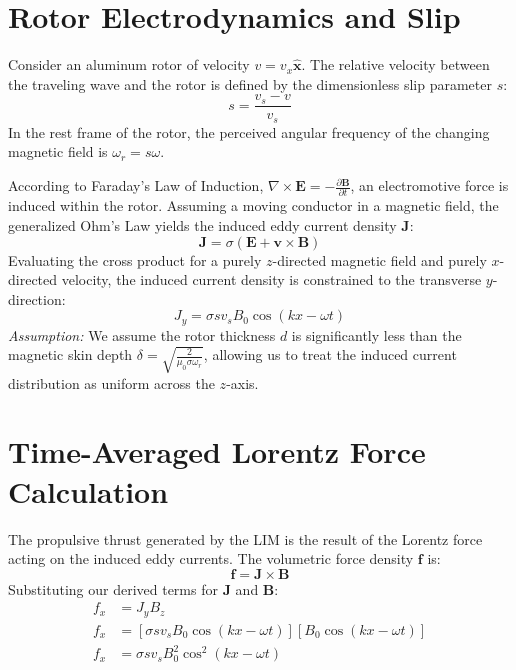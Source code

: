 \documentclass[12pt, a4paper]{article}
\begin{document}
\section{Rotor Electrodynamics and Slip}
Consider an aluminum rotor of velocity $v = v_x \mathbf{\hat{x}}$. The relative velocity between the traveling wave and the rotor is defined by the dimensionless slip parameter $s$:
\begin{equation}
    s = \frac{v_s - v}{v_s}
\end{equation}
In the rest frame of the rotor, the perceived angular frequency of the changing magnetic field is $\omega_r = s\omega$.

According to Faraday's Law of Induction, $\nabla \times \mathbf{E} = -\frac{\partial \mathbf{B}}{\partial t}$, an electromotive force is induced within the rotor. Assuming a moving conductor in a magnetic field, the generalized Ohm's Law yields the induced eddy current density $\mathbf{J}$:
\begin{equation}
    \mathbf{J} = \sigma(\mathbf{E} + \mathbf{v} \times \mathbf{B})
\end{equation}
Evaluating the cross product for a purely $z$-directed magnetic field and purely $x$-directed velocity, the induced current density is constrained to the transverse $y$-direction:
\begin{equation}
    J_y = \sigma s v_s B_0 \cos(kx - \omega t)
\end{equation}
\textit{Assumption:} We assume the rotor thickness $d$ is significantly less than the magnetic skin depth $\delta = \sqrt{\frac{2}{\mu_0 \sigma \omega_r}}$, allowing us to treat the induced current distribution as uniform across the $z$-axis.

\section{Time-Averaged Lorentz Force Calculation}
The propulsive thrust generated by the LIM is the result of the Lorentz force acting on the induced eddy currents. The volumetric force density $\mathbf{f}$ is:
\begin{equation}
    \mathbf{f} = \mathbf{J} \times \mathbf{B}
\end{equation}
Substituting our derived terms for $\mathbf{J}$ and $\mathbf{B}$:
\begin{align}
    f_x &= J_y B_z \\
    f_x &= \left[ \sigma s v_s B_0 \cos(kx - \omega t) \right] \left[ B_0 \cos(kx - \omega t) \right] \\
    f_x &= \sigma s v_s B_0^2 \cos^2(kx - \omega t)
\end{align}
\end{document}
